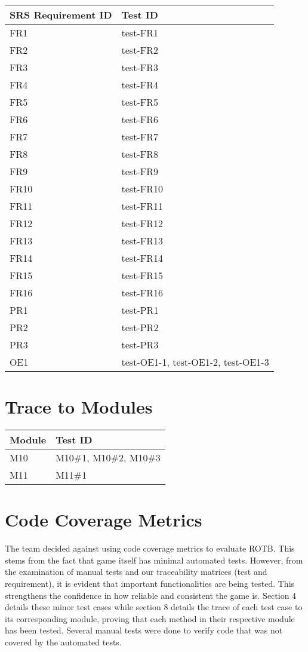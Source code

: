 \documentclass[12pt, titlepage]{article}
\begin{document}
\begin{tabular}{ |p{5cm}|p{8cm}|  } 
 \hline
  SRS Requirement ID & Test ID\\
 \hline
 FR1 & test-FR1\\
  \hline
   FR2 & test-FR2\\
  \hline
   FR3 & test-FR3\\
  \hline
   FR4 & test-FR4\\
  \hline
   FR5 & test-FR5\\
  \hline
   FR6 & test-FR6\\
  \hline
   FR7 & test-FR7\\
  \hline
   FR8 & test-FR8\\
  \hline
  FR9 & test-FR9\\
  \hline
  FR10 & test-FR10\\
  \hline
  FR11 & test-FR11\\
  \hline
  FR12 & test-FR12\\
  \hline
  FR13 & test-FR13\\
  \hline
  FR14 & test-FR14\\
  \hline
  FR15 & test-FR15\\
  \hline
   FR16 & test-FR16\\
  \hline
   PR1 & test-PR1\\
  \hline
   PR2 & test-PR2\\
  \hline
   PR3 & test-PR3\\
  \hline
   OE1 & test-OE1-1, test-OE1-2, test-OE1-3\\
  \hline

\end{tabular}
		
\section{Trace to Modules}	
\begin{tabular}{ |p{5cm}|p{8cm}|  } 
 \hline
  Module & Test ID\\
 \hline
    M10 & M10\#1, M10\#2, M10\#3\\
     \hline
     M11 & M11\#1\\
     \hline
\end{tabular}

\section{Code Coverage Metrics}
 The team decided against using code coverage metrics to evaluate ROTB. This stems from the fact that game itself has minimal automated tests. However, from the examination of manual tests and our traceability matrices (test and requirement), it is evident that important functionalities are being tested. This strengthens the confidence in how reliable and consistent the game is. Section 4 details these minor test cases while section 8 details the trace of each test case to its corresponding module, proving that each method in their respective module has been tested. Several manual tests were done to verify code that was not covered by the automated tests. 




\end{document}
